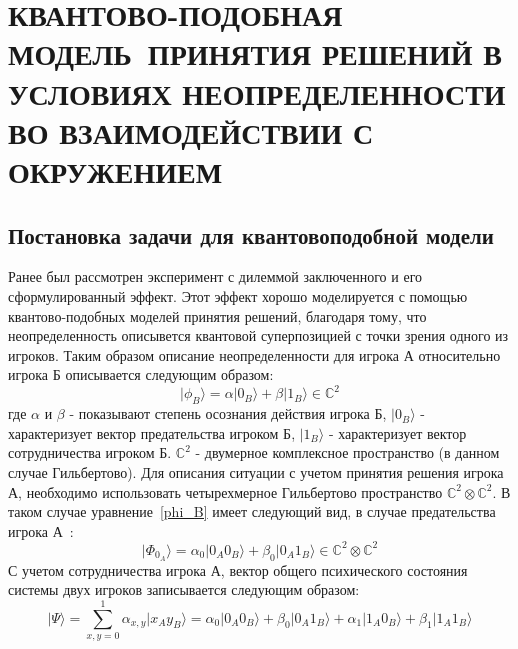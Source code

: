 \chapter{КВАНТОВО-ПОДОБНАЯ МОДЕЛЬ~ПРИНЯТИЯ РЕШЕНИЙ В УСЛОВИЯХ НЕОПРЕДЕЛЕННОСТИ ВО ВЗАИМОДЕЙСТВИИ С ОКРУЖЕНИЕМ}
\section{Постановка задачи для квантовоподобной модели}

Ранее был рассмотрен эксперимент с дилеммой заключенного и его сформулированный эффект.
Этот эффект хорошо моделируется с помощью квантово-подобных моделей принятия решений, благодаря
тому, что неопределенность описывется квантовой суперпозицией с точки зрения одного из игроков.
Таким образом описание неопределенности для игрока А относительно игрока Б описывается следующим образом:
\begin{equation}\label{phi_B}
    \vert \phi_{B} \rangle = \alpha \vert 0_{B} \rangle + \beta \vert 1_{B} \rangle \in \mathbb{C}^{2} %
\end{equation}
где $\alpha$ и $\beta$ - показывают степень осознания действия игрока Б, $\vert 0_{B} \rangle$ - характеризует
вектор предательства игроком Б, $\vert 1_{B} \rangle$ - характеризует вектор сотрудничества игроком Б.
$\mathbb{C}^{2}$ - двумерное комплексное пространство (в данном случае Гильбертово).
Для описания ситуации с учетом принятия решения игрока А, необходимо использовать четырехмерное Гильбертово
пространство $\mathbb{C}^{2} \otimes \mathbb{C}^{2}$.
В таком случае уравнение~\eqref{phi_B} имеет следующий вид, в случае предательства игрока А~\citep{asano2011quantum}:
\begin{equation}
    \vert \Phi_{0_{A}} \rangle = \alpha_{0} \vert 0_{A} 0_{B} \rangle + \beta_{0} \vert 0_{A} 1_{B} \rangle \in \mathbb{C}^{2} \otimes \mathbb{C}^{2}
\end{equation}
С учетом сотрудничества игрока А, вектор общего психического состояния системы двух игроков записывается
следующим образом:
\begin{equation}
    \vert \Psi \rangle = \sum_{x,y=0}^{1} \alpha_{x,y} \vert x_{A} y_{B} \rangle =
    \alpha_{0} \vert 0_{A} 0_{B} \rangle + \beta_{0} \vert 0_{A} 1_{B} \rangle +
    \alpha_{1} \vert 1_{A} 0_{B} \rangle + \beta_{1} \vert 1_{A} 1_{B} \rangle
\end{equation}

